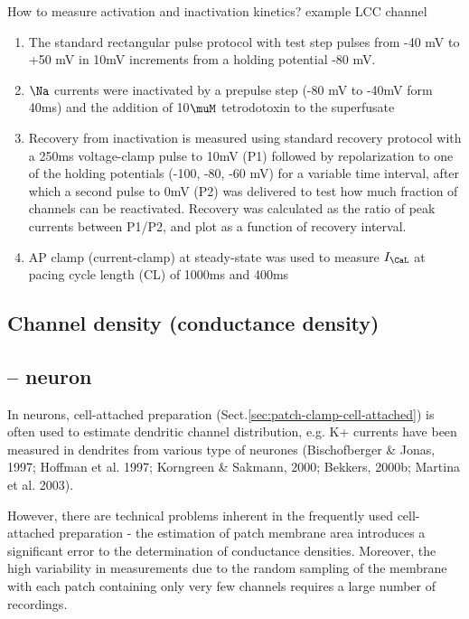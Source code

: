 How to measure activation and inactivation kinetics? example LCC channel
\citep{mahajan2008}
\begin{enumerate}
  \item The standard rectangular pulse protocol with test step pulses from -40
  mV to +50 mV in 10mV increments from a holding potential -80 mV.
  \item $\Na$ currents were inactivated by a prepulse step (-80 mV to -40mV
  form 40ms) and the addition of 10$\muM$ tetrodotoxin to the superfusate
  \item Recovery from inactivation is measured using standard recovery protocol
  with a 250ms voltage-clamp pulse to 10mV (P1) followed by repolarization to
  one of the holding potentials (-100, -80, -60 mV) for a variable time
  interval, after which a second pulse to 0mV (P2) was delivered to test how
  much fraction of channels can be reactivated. Recovery was calculated as the
  ratio of peak currents between P1/P2, and plot as a function of recovery
  interval.
  \item AP clamp (current-clamp) at steady-state was used to measure $I_\CaL$ at
  pacing cycle length (CL) of 1000ms and 400ms
\end{enumerate}

\subsection{Channel density (conductance density)}
\label{sec:conductance-density-estimation}


\subsection{-- neuron}

In neurons, cell-attached preparation (Sect.\ref{sec:patch-clamp-cell-attached})
is often used to estimate dendritic channel distribution, e.g.  K+ currents have
been measured in dendrites from various type of neurones (Bischofberger \& Jonas,
1997; Hoffman et al. 1997; Korngreen \& Sakmann, 2000; Bekkers, 2000b; Martina et
al. 2003).

However, there are technical problems inherent in the frequently used
cell-attached preparation - the estimation of patch membrane area introduces a
significant error to the determination of conductance densities. Moreover, the
high variability in measurements due to the random sampling of the membrane with
each patch containing only very few channels requires a large number of
recordings.

